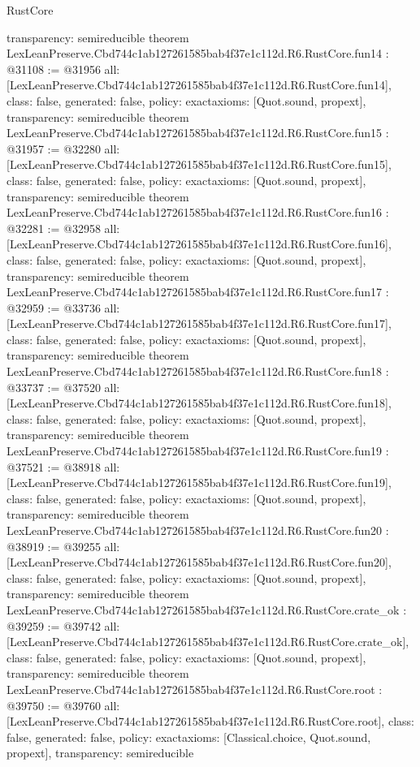 \begin{lexlean}{RustCore}
\begin{coremodule}
{  transparency: semireducible
}
theorem LexLeanPreserve.Cbd744c1ab127261585bab4f37e1c112d.R6.RustCore.fun14 : @31108 := @31956 {
  all: [LexLeanPreserve.Cbd744c1ab127261585bab4f37e1c112d.R6.RustCore.fun14],
  class: false,
  generated: false,
  policy: exact{axioms: [Quot.sound, propext]},
  transparency: semireducible
}
theorem LexLeanPreserve.Cbd744c1ab127261585bab4f37e1c112d.R6.RustCore.fun15 : @31957 := @32280 {
  all: [LexLeanPreserve.Cbd744c1ab127261585bab4f37e1c112d.R6.RustCore.fun15],
  class: false,
  generated: false,
  policy: exact{axioms: [Quot.sound, propext]},
  transparency: semireducible
}
theorem LexLeanPreserve.Cbd744c1ab127261585bab4f37e1c112d.R6.RustCore.fun16 : @32281 := @32958 {
  all: [LexLeanPreserve.Cbd744c1ab127261585bab4f37e1c112d.R6.RustCore.fun16],
  class: false,
  generated: false,
  policy: exact{axioms: [Quot.sound, propext]},
  transparency: semireducible
}
theorem LexLeanPreserve.Cbd744c1ab127261585bab4f37e1c112d.R6.RustCore.fun17 : @32959 := @33736 {
  all: [LexLeanPreserve.Cbd744c1ab127261585bab4f37e1c112d.R6.RustCore.fun17],
  class: false,
  generated: false,
  policy: exact{axioms: [Quot.sound, propext]},
  transparency: semireducible
}
theorem LexLeanPreserve.Cbd744c1ab127261585bab4f37e1c112d.R6.RustCore.fun18 : @33737 := @37520 {
  all: [LexLeanPreserve.Cbd744c1ab127261585bab4f37e1c112d.R6.RustCore.fun18],
  class: false,
  generated: false,
  policy: exact{axioms: [Quot.sound, propext]},
  transparency: semireducible
}
theorem LexLeanPreserve.Cbd744c1ab127261585bab4f37e1c112d.R6.RustCore.fun19 : @37521 := @38918 {
  all: [LexLeanPreserve.Cbd744c1ab127261585bab4f37e1c112d.R6.RustCore.fun19],
  class: false,
  generated: false,
  policy: exact{axioms: [Quot.sound, propext]},
  transparency: semireducible
}
theorem LexLeanPreserve.Cbd744c1ab127261585bab4f37e1c112d.R6.RustCore.fun20 : @38919 := @39255 {
  all: [LexLeanPreserve.Cbd744c1ab127261585bab4f37e1c112d.R6.RustCore.fun20],
  class: false,
  generated: false,
  policy: exact{axioms: [Quot.sound, propext]},
  transparency: semireducible
}
theorem LexLeanPreserve.Cbd744c1ab127261585bab4f37e1c112d.R6.RustCore.crate_ok : @39259 := @39742 {
  all: [LexLeanPreserve.Cbd744c1ab127261585bab4f37e1c112d.R6.RustCore.crate_ok],
  class: false,
  generated: false,
  policy: exact{axioms: [Quot.sound, propext]},
  transparency: semireducible
}
theorem LexLeanPreserve.Cbd744c1ab127261585bab4f37e1c112d.R6.RustCore.root : @39750 := @39760 {
  all: [LexLeanPreserve.Cbd744c1ab127261585bab4f37e1c112d.R6.RustCore.root],
  class: false,
  generated: false,
  policy: exact{axioms: [Classical.choice, Quot.sound, propext]},
  transparency: semireducible
}


\end{coremodule}
\end{lexlean}
